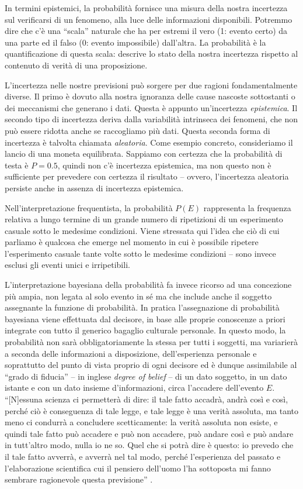 \documentclass[
  11pt,
]{krantz}
\theoremstyle{definition}
\theoremstyle{definition}
\theoremstyle{definition}
\theoremstyle{definition}
\theoremstyle{remark}
\begin{document}
In termini epistemici, la probabilità fornisce una misura della nostra incertezza sul verificarsi di un fenomeno, alla luce delle informazioni disponibili. Potremmo dire che c'è una ``scala'' naturale che ha per estremi il vero (1: evento certo) da una parte ed il falso (0: evento impossibile) dall'altra. La probabilità è la quantificazione di questa scala: descrive lo stato della nostra incertezza rispetto al contenuto di verità di una proposizione.

L'incertezza nelle nostre previsioni può sorgere per due ragioni fondamentalmente diverse. Il primo è dovuto alla nostra ignoranza delle cause nascoste sottostanti o dei meccanismi che generano i dati. Questa è appunto un'incertezza \emph{epistemica}. Il secondo tipo di incertezza deriva dalla variabilità intrinseca dei fenomeni, che non può essere ridotta anche se raccogliamo più dati. Questa seconda forma di incertezza è talvolta chiamata \emph{aleatoria}. Come esempio concreto, consideriamo il lancio di una moneta equilibrata. Sappiamo con certezza che la probabilità di testa è \(P = 0.5\), quindi non c'è incertezza epistemica, ma non questo non è sufficiente per prevedere con certezza il risultato -- ovvero, l'incertezza aleatoria persiste anche in assenza di incertezza epistemica.

Nell'interpretazione frequentista, la probabilità \(P(E)\) rappresenta la frequenza relativa a lungo termine di un grande numero di ripetizioni di un esperimento casuale sotto le medesime condizioni. Viene stressata qui l'idea che ciò di cui parliamo è qualcosa che emerge nel momento in cui è possibile ripetere l'esperimento casuale tante volte sotto le medesime condizioni -- sono invece esclusi gli eventi unici e irripetibili.

L'interpretazione bayesiana della probabilità fa invece ricorso ad una concezione più ampia, non legata al solo evento in sé ma che include anche il soggetto assegnante la funzione di probabilità. In pratica l'assegnazione di probabilità bayesiana viene effettuata dal decisore, in base alle proprie conoscenze a priori integrate con tutto il generico bagaglio culturale personale. In questo modo, la probabilità non sarà obbligatoriamente la stessa per tutti i soggetti, ma variarierà a seconda delle informazioni a disposizione, dell'esperienza personale e soprattutto del punto di vista proprio di ogni decisore ed è dunque assimilabile al ``grado di fiducia'' -- in inglese \emph{degree of belief} -- di un dato soggetto, in un dato istante e con un dato insieme d'informazioni, circa l'accadere dell'evento \(E\). ``{[}N{]}essuna scienza ci permetterà di dire: il tale fatto accadrà, andrà così e così, perché ciò è conseguenza di tale legge, e tale legge è una verità assoluta, ma tanto meno ci condurrà a concludere scetticamente: la verità assoluta non esiste, e quindi tale fatto può accadere e può non accadere, può andare così e può andare in tutt'altro modo, nulla io ne so. Quel che si potrà dire è questo: io prevedo che il tale fatto avverrà, e avverrà nel tal modo, perché l'esperienza del passato e l'elaborazione scientifica cui il pensiero dell'uomo l'ha sottoposta mi fanno sembrare ragionevole questa previsione'' \citep{definetti1931prob}.
\end{document}
